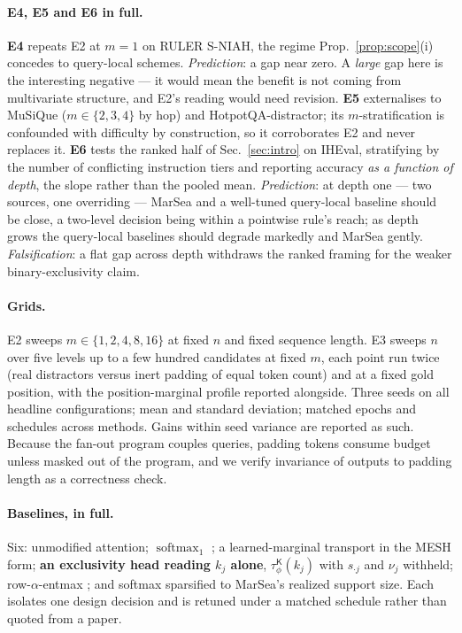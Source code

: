 \documentclass{article}
\newcommand{\softmaxop}{\operatorname{softmax}}
\newcommand{\tauK}{\tau^{\mathsf{K}}_\phi}
\begin{document}
\paragraph{E4, E5 and E6 in full.} \textbf{E4} repeats E2 at $m=1$ on RULER S-NIAH, the regime
Prop.~\ref{prop:scope}(i) concedes to query-local schemes. \emph{Prediction}: a gap near zero. A
\emph{large} gap here is the interesting negative --- it would mean the benefit is not coming
from multivariate structure, and E2's reading would need revision. \textbf{E5} externalises to
MuSiQue ($m\in\{2,3,4\}$ by hop) and HotpotQA-distractor; its $m$-stratification is confounded
with difficulty by construction, so it corroborates E2 and never replaces it. \textbf{E6} tests
the ranked half of Sec.~\ref{sec:intro} on IHEval, stratifying by the number of conflicting
instruction tiers and reporting accuracy \emph{as a function of depth}, the slope rather than the
pooled mean. \emph{Prediction}: at depth one --- two sources, one overriding --- MarSea and a
well-tuned query-local baseline should be close, a two-level decision being within a pointwise
rule's reach; as depth grows the query-local baselines should degrade markedly and MarSea gently.
\emph{Falsification}: a flat gap across depth withdraws the ranked framing for the weaker
binary-exclusivity claim.

\paragraph{Grids.} E2 sweeps $m\in\{1,2,4,8,16\}$ at fixed $n$ and fixed sequence length. E3
sweeps $n$ over five levels up to a few hundred candidates at fixed $m$, each point run twice
(real distractors versus inert padding of equal token count) and at a fixed gold position, with
the position-marginal profile reported alongside. Three seeds on all headline configurations;
mean and standard deviation; matched epochs and schedules across methods. Gains within seed
variance are reported as such. Because the fan-out program couples queries, padding tokens
consume budget unless masked out of the program, and we verify invariance of outputs to padding
length as a correctness check.

\paragraph{Baselines, in full.} Six: unmodified attention; $\softmaxop_1$
\citep{miller2023attention}; a learned-marginal transport in the MESH form; \textbf{an
exclusivity head reading $k_j$ alone}, $\tauK(k_j)$ with $s_{\cdot j}$ and $\nu_j$ withheld;
row-$\alpha$-entmax
\citep{peters2019sparse}; and softmax sparsified to MarSea's realized support size. Each isolates
one design decision and is retuned under a matched schedule rather than quoted from a paper.
\end{document}
